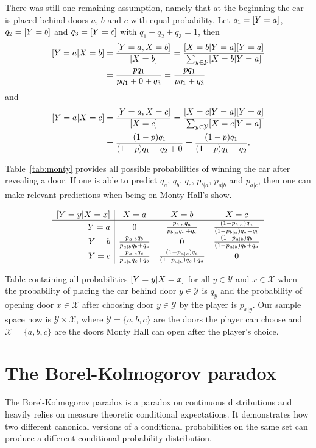 \documentclass[twoside,a4paper]{article}
\theoremstyle{plain}
\theoremstyle{definition}
\theoremstyle{remark}
\numberwithin{equation}{section}
\let\P\relax
\DeclareMathOperator{\P}{\mathbb{P}}
\DeclareMathOperator{\1}{\mathbbm{1}}
\newcommand{\X}{\mathcal{X}}
\newcommand{\Y}{\mathcal{Y}}
\begin{document}
There was still one remaining assumption, namely that at the beginning the car is placed behind doors $a$, $b$ and $c$ with equal probability. Let $q_1=\P[Y=a]$, $q_2=\P[Y=b]$ and $q_3=\P[Y=c]$ with $q_1+q_2+q_3=1$, then
\begin{align*}
\P[Y=a|X=b]&=\frac{\P[Y=a,X=b]}{\P[X=b]}=\frac{\P[X=b|Y=a]\P[Y=a]}{\sum_{y\in\Y}\P[X=b|Y=a]}\\
&=\frac{pq_1}{pq_1+0+q_3}=\frac{pq_1}{pq_1+q_3}
\end{align*}
and
\begin{align*}
\P[Y=a|X=c]&=\frac{\P[Y=a,X=c]}{\P[X=c]}=\frac{\P[X=c|Y=a]\P[Y=a]}{\sum_{y\in\Y}\P[X=c|Y=a]}\\
&=\frac{(1-p)q_1}{(1-p)q_1+q_2+0}=\frac{(1-p)q_1}{(1-p)q_1+q_2}.
\end{align*}

Table~\ref{tab:monty} provides all possible probabilities of winning the car after revealing a door. If one is able to predict $q_a$, $q_b$, $q_c$, $p_{b|a}$, $p_{a|b}$ and $p_{a|c}$, then one can make relevant predictions when being on Monty Hall's show.

\begin{table}
\[
\begin{array}{r|ccc}
\P[Y=y|X=x]&X=a&X=b&X=c\\\hline
Y=a&0&\frac{p_{b|a}q_a}{p_{b|a}q_a+q_c}&\frac{(1-p_{b|a})q_a}{(1-p_{b|a})q_a+q_b}\\
Y=b&\frac{p_{a|b}q_b}{p_{a|b}q_b+q_c}&0&\frac{(1-p_{a|b})q_b}{(1-p_{a|b})q_b+q_a}\\
Y=c&\frac{p_{a|c}q_c}{p_{a|c}q_c+q_b}&\frac{(1-p_{a|c})q_c}{(1-p_{a|c})q_c+q_a}&0
\end{array}
\]
\caption{Table containing all probabilities $\P[Y=y|X=x]$ for all $y\in\Y$ and $x\in\X$ when the probability of placing the car behind door $y\in\Y$ is $q_y$ and the probability of opening door $x\in\X$ after choosing door $y\in\Y$ by the player is $p_{x|y}$. Our sample space now is $\Y\times\X$, where $\Y=\{a,b,c\}$ are the doors the player can choose and $\X=\{a,b,c\}$ are the doors Monty Hall can open after the player's choice.}
\label{tab:monty}
\end{table}

\section{The Borel-Kolmogorov paradox}
The Borel-Kolmogorov paradox is a paradox on continuous distributions and heavily relies on measure theoretic conditional expectations. It demonstrates how two different canonical versions of a conditional probabilities on the same set can produce a different conditional probability distribution.
\end{document}
